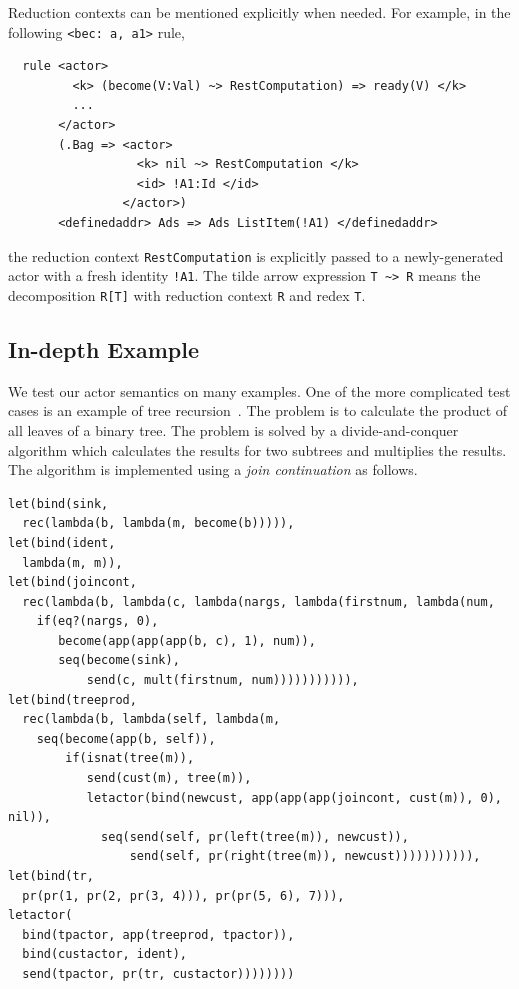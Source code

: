 \documentclass{llncs}
\begin{document}
Reduction contexts can be mentioned explicitly when needed.
For example, in the following \texttt{<bec: a, a1>} rule,
\small
\begin{verbatim}
  rule <actor>
         <k> (become(V:Val) ~> RestComputation) => ready(V) </k>
         ...
       </actor>
       (.Bag => <actor>
                  <k> nil ~> RestComputation </k>
                  <id> !A1:Id </id>
                </actor>)
       <definedaddr> Ads => Ads ListItem(!A1) </definedaddr>
\end{verbatim}
\normalsize
the reduction context \texttt{RestComputation} is explicitly passed to a 
newly-generated actor with a fresh identity \verb|!A1|.
The tilde arrow expression \verb|T ~> R| 
means the decomposition \verb|R[T]| with reduction context \texttt{R} and redex 
\texttt{T}.

\subsection{In-depth Example}
We test our actor semantics on many examples. One of the more complicated test
cases is an example of tree recursion~\cite{actor}.  The problem is to calculate
the product of all leaves of a binary tree.  The problem is solved by a
divide-and-conquer algorithm which calculates the results for two subtrees and
multiplies the results.  The algorithm is implemented using a
\emph{join continuation} as follows.
\small
\begin{verbatim}
let(bind(sink,
  rec(lambda(b, lambda(m, become(b))))),
let(bind(ident,
  lambda(m, m)),
let(bind(joincont,
  rec(lambda(b, lambda(c, lambda(nargs, lambda(firstnum, lambda(num,
    if(eq?(nargs, 0),
       become(app(app(app(b, c), 1), num)),
       seq(become(sink),
           send(c, mult(firstnum, num))))))))))),
let(bind(treeprod,
  rec(lambda(b, lambda(self, lambda(m,
    seq(become(app(b, self)),
        if(isnat(tree(m)),
           send(cust(m), tree(m)),
           letactor(bind(newcust, app(app(app(joincont, cust(m)), 0), nil)),
             seq(send(self, pr(left(tree(m)), newcust)),
                 send(self, pr(right(tree(m)), newcust))))))))))),
let(bind(tr, 
  pr(pr(1, pr(2, pr(3, 4))), pr(pr(5, 6), 7))),
letactor(
  bind(tpactor, app(treeprod, tpactor)),
  bind(custactor, ident),
  send(tpactor, pr(tr, custactor))))))))
\end{verbatim}
\normalsize
\end{document}
